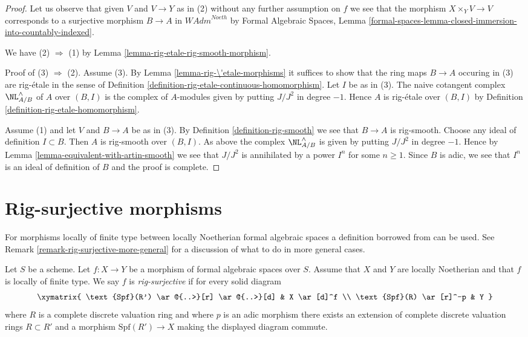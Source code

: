 \begin{proof}
Let us observe that given $V$ and $V \to Y$ as in (2) without any
further assumption on $f$ we see that the morphism $X \times_Y V \to V$
corresponds to a surjective morphism $B \to A$ in $\textit{WAdm}^{Noeth}$
by Formal Algebraic Spaces, Lemma
\ref{formal-spaces-lemma-closed-immersion-into-countably-indexed}.

\medskip\noindent
We have (2) $\Rightarrow$ (1) by
Lemma \ref{lemma-rig-etale-rig-smooth-morphism}.

\medskip\noindent
Proof of (3) $\Rightarrow$ (2). Assume (3). By
Lemma \ref{lemma-rig-\'etale-morphisms}
it suffices to show that the ring maps
$B \to A$ occuring in (3) are rig-\'etale in the
sense of Definition \ref{definition-rig-etale-continuous-homomorphism}.
Let $I$ be as in (3). The naive cotangent complex
$\NL_{A/B}^\wedge$ of $A$ over $(B, I)$ is the complex of $A$-modules
given by putting $J/J^2$ in degree $-1$. Hence $A$ is
rig-\'etale over $(B, I)$ by
Definition \ref{definition-rig-etale-homomorphism}.

\medskip\noindent
Assume (1) and let $V$ and $B \to A$ be as in (3).
By Definition \ref{definition-rig-smooth} we see that
$B \to A$ is rig-smooth. Choose any ideal of definition $I \subset B$.
Then $A$ is rig-smooth over $(B, I)$.
As above the complex $\NL_{A/B}^\wedge$ is 
given by putting $J/J^2$ in degree $-1$.
Hence by Lemma \ref{lemma-equivalent-with-artin-smooth}
we see that $J/J^2$ is annihilated by
a power $I^n$ for some $n \geq 1$. Since $B$ is adic, we see
that $I^n$ is an ideal of definition of $B$ and the
proof is complete.
\end{proof}














\section{Rig-surjective morphisms}
\label{section-rig-surjective}

\noindent
For morphisms locally of finite type between locally Noetherian formal
algebraic spaces a definition borrowed from \cite{ArtinII} can be used. See
Remark \ref{remark-rig-surjective-more-general} for a discussion
of what to do in more general cases.

\begin{definition}
\label{definition-rig-surjective}
Let $S$ be a scheme. Let $f : X \to Y$ be a morphism of formal
algebraic spaces over $S$. Assume that $X$ and $Y$ are locally
Noetherian and that $f$ is locally of finite type. We say
$f$ is {\it rig-surjective} if for every solid diagram
$$
\xymatrix{
\text{Spf}(R') \ar@{..>}[r] \ar@{..>}[d] & X \ar[d]^f \\
\text{Spf}(R) \ar[r]^-p & Y
}
$$
where $R$ is a complete discrete valuation ring and where
$p$ is an adic morphism there exists an
extension of complete discrete valuation rings $R \subset R'$
and a morphism $\text{Spf}(R') \to X$ making the displayed diagram commute.
\end{definition}

